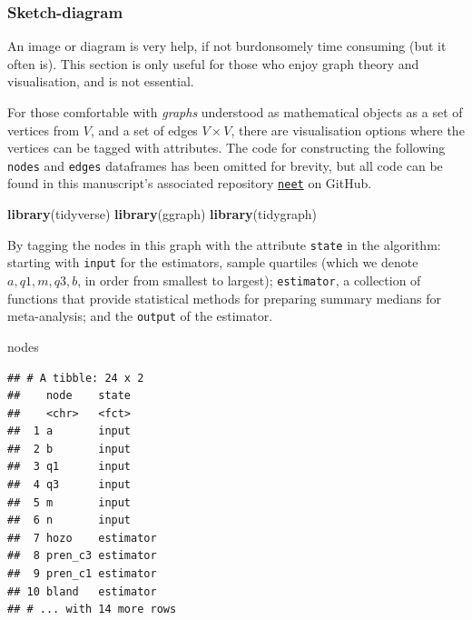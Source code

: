 \documentclass[
]{article}
\newenvironment{Shaded}{\begin{snugshade}}{\end{snugshade}}
\newcommand{\KeywordTok}[1]{\textcolor[rgb]{0.13,0.29,0.53}{\textbf{#1}}}
\newcommand{\NormalTok}[1]{#1}
\begin{document}
\hypertarget{sketch-diagram}{%
\subsubsection{Sketch-diagram}\label{sketch-diagram}}

An image or diagram is very help, if not burdonsomely time consuming
(but it often is). This section is only useful for those who enjoy graph
theory and visualisation, and is not essential.

For those comfortable with \emph{graphs} understood as mathematical
objects as a set of vertices from \(V\), and a set of edges
\(V \times V\), there are visualisation options where the vertices can
be tagged with attributes. The code for constructing the following
\texttt{nodes} and \texttt{edges} dataframes has been omitted for
brevity, but all code can be found in this manuscript's associated
repository \href{https://github.com/softloud/neet}{\texttt{neet}} on
GitHub.

\begin{Shaded}
\begin{Highlighting}[]
\KeywordTok{library}\NormalTok{(tidyverse)}
\KeywordTok{library}\NormalTok{(ggraph)}
\KeywordTok{library}\NormalTok{(tidygraph)}
\end{Highlighting}
\end{Shaded}

By tagging the nodes in this graph with the attribute \texttt{state} in
the algorithm: starting with \texttt{input} for the estimators, sample
quartiles (which we denote \(a, q1, m, q3, b\), in order from smallest
to largest); \texttt{estimator}, a collection of functions that provide
statistical methods for preparing summary medians for meta-analysis; and
the \texttt{output} of the estimator.

\begin{Shaded}
\begin{Highlighting}[]
\NormalTok{nodes}
\end{Highlighting}
\end{Shaded}

\begin{verbatim}
## # A tibble: 24 x 2
##    node    state    
##    <chr>   <fct>    
##  1 a       input    
##  2 b       input    
##  3 q1      input    
##  4 q3      input    
##  5 m       input    
##  6 n       input    
##  7 hozo    estimator
##  8 pren_c3 estimator
##  9 pren_c1 estimator
## 10 bland   estimator
## # ... with 14 more rows
\end{verbatim}
\end{document}
